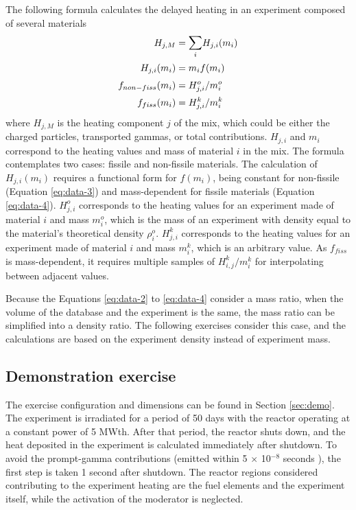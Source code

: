 The following formula calculates the delayed heating in an experiment composed of several materials
\begin{align}
H_{j,M} &= \mathlarger{\sum}_i H_{j,i}(m_i)  \label{eq:data-1} \\
H_{j,i}(m_i) &= m_i f(m_i)  \label{eq:data-2} \\
f_{non-fiss}(m_i) &= H_{j,i}^o / m_i^o  \label{eq:data-3} \\
f_{fiss}(m_i) &= H_{j,i}^k / m_i^k  \label{eq:data-4}
\end{align}
where $H_{j, M}$ is the heating component $j$ of the mix, which could be either the charged particles, transported gammas, or total contributions.
$H_{j,i}$ and $m_i$ correspond to the heating values and mass of material $i$ in the mix.
The formula contemplates two cases: fissile and non-fissile materials.
The calculation of $H_{j,i}(m_i)$ requires a functional form for $f(m_i)$, being constant for non-fissile (Equation \ref{eq:data-3}) and mass-dependent for fissile materials (Equation \ref{eq:data-4}).
$H_{j,i}^o$ corresponds to the heating values for an experiment made of material $i$ and mass $m_i^o$, which is the mass of an experiment with density equal to the material's theoretical density $\rho_i^o$.
$H_{j,i}^k$ corresponds to the heating values for an experiment made of material $i$ and mass $m_i^k$, which is an arbitrary value.
As $f_{fiss}$ is mass-dependent, it requires multiple samples of $H_{i,j}^k/m_i^k$ for interpolating between adjacent values.

Because the Equations \ref{eq:data-2} to \ref{eq:data-4} consider a mass ratio, when the volume of the database and the experiment is the same, the mass ratio can be simplified into a density ratio.
The following exercises consider this case, and the calculations are based on the experiment density instead of experiment mass.



\subsection{Demonstration exercise}

The exercise configuration and dimensions can be found in Section \ref{sec:demo}.
The experiment is irradiated for a period of 50 days with the reactor operating at a constant power of 5 MWth.
After that period, the reactor shuts down, and the heat deposited in the experiment is calculated immediately after shutdown.
To avoid the prompt-gamma contributions (emitted within 5 $\times$ 10$^{-8}$ seconds \cite{ilas_impact_2013}), the first step is taken 1 second after shutdown.
The reactor regions considered contributing to the experiment heating are the fuel elements and the experiment itself, while the activation of the moderator is neglected.

